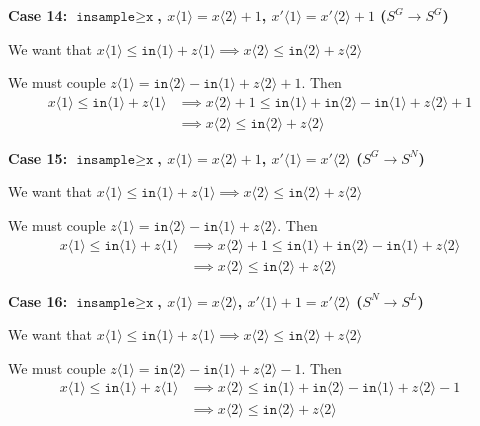 \documentclass[12pt]{article}
\newcommand{\gguard}[1][x]{\texttt{insample}\geq \texttt{#1}}
\newcommand{\brangle}[1]{\langle #1 \rangle}
\theoremstyle{definition}
\begin{document}
\textbf{Case 14: $\gguard$, $x\brangle{1}  = x \brangle{2}+1$, $x'\brangle{1} = x' \brangle{2}+1$ ($S^G\to S^G$)}

We want that $x\langle 1 \rangle \leq \texttt{in}\langle 1\rangle + z\brangle{1}\implies x \brangle{2} \leq \texttt{in}\brangle{2} + z\brangle{2}$

We must couple $z\brangle{1} =\texttt{in}\brangle{2}-\texttt{in}\brangle{1} +z\brangle{2}+1$.
Then \begin{align*}
	x\langle 1 \rangle \leq \texttt{in}\langle 1\rangle + z\brangle{1}&\implies x\brangle{2}+1 \leq \texttt{in}\brangle{1} + \texttt{in}\brangle{2}-\texttt{in}\brangle{1} +z\brangle{2}+1\\
	&\implies x\brangle{2} \leq \texttt{in}\brangle{2} + z\brangle{2}
\end{align*}

\textbf{Case 15: $\gguard$, $x\brangle{1}  = x \brangle{2}+1$, $x'\brangle{1} = x' \brangle{2}$ ($S^G\to S^N$)}

We want that $x\langle 1 \rangle \leq \texttt{in}\langle 1\rangle + z\brangle{1}\implies x \brangle{2} \leq \texttt{in}\brangle{2} + z\brangle{2}$

We must couple $z\brangle{1} =\texttt{in}\brangle{2}-\texttt{in}\brangle{1} +z\brangle{2}$.
Then \begin{align*}
	x\langle 1 \rangle \leq \texttt{in}\langle 1\rangle + z\brangle{1}&\implies x\brangle{2}+1 \leq \texttt{in}\brangle{1} + \texttt{in}\brangle{2}-\texttt{in}\brangle{1} +z\brangle{2}\\
	&\implies x\brangle{2} \leq \texttt{in}\brangle{2} + z\brangle{2}
\end{align*}

\textbf{Case 16: $\gguard$, $x\brangle{1}  = x \brangle{2}$, $x'\brangle{1}+1 = x' \brangle{2}$ ($S^N\to S^L$)}

We want that $x\langle 1 \rangle \leq \texttt{in}\langle 1\rangle + z\brangle{1}\implies x \brangle{2} \leq \texttt{in}\brangle{2} + z\brangle{2}$

We must couple $z\brangle{1} =\texttt{in}\brangle{2}-\texttt{in}\brangle{1} +z\brangle{2}-1$.
Then \begin{align*}
	x\langle 1 \rangle \leq \texttt{in}\langle 1\rangle + z\brangle{1}&\implies x\brangle{2} \leq \texttt{in}\brangle{1} + \texttt{in}\brangle{2}-\texttt{in}\brangle{1} +z\brangle{2}-1\\
	&\implies x\brangle{2} \leq \texttt{in}\brangle{2} + z\brangle{2}
\end{align*}
\end{document}
